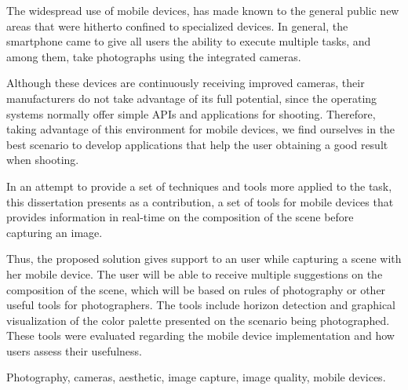 \abstractEN
The widespread use of mobile devices, has made known to the general public new areas that were hitherto confined to specialized devices. In general, the smartphone came to give all users the ability to execute multiple tasks, and among them, take photographs using the integrated cameras.


Although these devices are continuously receiving improved cameras, their manufacturers do not take advantage of its full potential, since the operating systems normally offer simple APIs and applications for shooting. Therefore, taking advantage of this environment for mobile devices, we find ourselves in the best scenario to develop applications that help the user obtaining a good result when shooting.


In an attempt to provide a set of techniques and tools more applied to the task, this dissertation presents as a contribution, a set of tools for mobile devices that provides information in real-time on the composition of the scene before capturing an image.

Thus, the proposed solution gives support to an user while capturing a scene with her mobile device. The user will be able to receive multiple suggestions on the composition of the scene, which will be based on rules of photography or other useful tools for photographers. The tools include horizon detection and graphical visualization of the color palette presented on the scenario being photographed. These tools were evaluated regarding the mobile device implementation and how users assess their usefulness.

\begin{keywords}
Photography, cameras, aesthetic, image capture, image quality, mobile devices.
\end{keywords}
